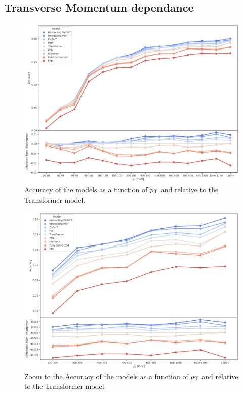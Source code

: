 \subsection{Transverse Momentum dependance}
\label{sec:pt_dependance}
\begin{figure}[htb]
    \centering
    \includegraphics[width=1\linewidth]{src/plots/results/pT_dep/relative_accuracy.jpg}
    \caption{Accuracy of the models as a function of $p_\text{T}$ and relative to the Transformer model.}
    \label{fig:pt_dep_acc}
\end{figure}
\begin{figure}[htb]
    \centering
    \includegraphics[width=1\linewidth]{src/plots/results/pT_dep/relative_accuracy_zoom.jpg}
    \caption{Zoom to the Accuracy of the models as a function of $p_\text{T}$ and relative to the Transformer model.}
    \label{fig:pt_dep_acc_zoom}
\end{figure}
